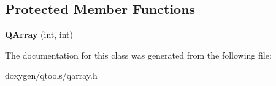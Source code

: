 \subsection*{Protected Member Functions}
\begin{DoxyCompactItemize}
\item 
\mbox{\label{class_q_array_a6597f735b588e282baaf467f4886f94d}} 
{\bfseries Q\+Array} (int, int)
\end{DoxyCompactItemize}


The documentation for this class was generated from the following file\+:\begin{DoxyCompactItemize}
\item 
doxygen/qtools/qarray.\+h\end{DoxyCompactItemize}
